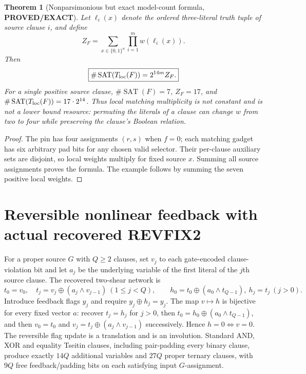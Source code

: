 \documentclass[11pt]{article}
\newtheorem{theorem}{Theorem}
\newcommand{\SAT}{\operatorname{SAT}}
\newcommand{\EXACT}{\textbf{PROVED/EXACT}}
\begin{document}
\begin{theorem}[Nonparsimonious but exact model-count formula, \EXACT]
Let $\ell_i(x)$ denote the ordered three-literal truth tuple of source
clause $i$, and define
\[
 Z_F=\sum_{x\in\{0,1\}^n}\prod_{i=1}^m w(\ell_i(x)).
\]
Then
\[
\boxed{\#\SAT(T_{\rm loc}(F))=2^{14m}Z_F.}
\]
For a single positive source clause, $\#\SAT(F)=7$,
$Z_F=17$, and $\#\SAT(T_{\rm loc}(F))=17\cdot2^{14}$.
Thus local matching multiplicity is not constant and is not a lower bound
resource: permuting the literals of a clause can change $w$ from two to four
while preserving the clause's Boolean relation.
\end{theorem}
\begin{proof}
The pin has four assignments $(r,s)$ when $f=0$; each matching gadget has
six arbitrary pad bits for any chosen valid selector.  Their per-clause
auxiliary sets are disjoint, so local weights multiply for fixed source
$x$.  Summing all source assignments proves the formula.  The example
follows by summing the seven positive local weights.
\end{proof}

\section{Reversible nonlinear feedback with actual recovered REVFIX2}
For a proper source $G$ with $Q\ge2$ clauses, set $v_j$ to each gate-encoded
clause-violation bit and let $a_j$ be the underlying variable of the first
literal of the $j$th source clause.  The recovered two-shear network is
\[
 t_0=v_0,\quad t_j=v_j\oplus(a_j\land v_{j-1})\ (1\le j<Q),
 \qquad h_0=t_0\oplus(a_0\land t_{Q-1}),\ h_j=t_j\ (j>0).
\]
Introduce feedback flags $y_j$ and require
$y_j\oplus h_j=y_j$.
The map $v\mapsto h$ is bijective for every fixed vector $a$:
recover $t_j=h_j$ for $j>0$, then
$t_0=h_0\oplus(a_0\land t_{Q-1})$, and then
$v_0=t_0$ and $v_j=t_j\oplus(a_j\land v_{j-1})$ successively.
Hence $h=0\iff v=0$.  The reversible flag update is a translation
and is an involution.  Standard AND, XOR and equality Tseitin clauses,
including pair-padding every binary clause, produce exactly $14Q$
additional variables and $27Q$ proper ternary clauses, with $9Q$
free feedback/padding bits on each satisfying input $G$-assignment.
\end{document}
